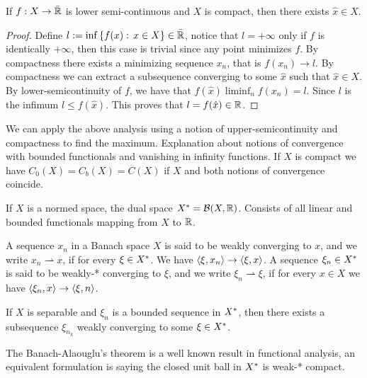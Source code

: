 \begin{theorem}
	If $f: X\rightarrow\bar{\mathbb{R}}$ is lower semi-continuous and $X$ is compact, then there exists $\hat x \in X$.
	\begin{proof}
		Define $l:=\inf\left\lbrace f(x): \, x \in X \right\rbrace \in \bar{\mathbb{R}}$, notice that $l=+\infty$ only if $f$ is identically $+\infty$, then this case is trivial since any point minimizes $f$. By compactness there exists a minimizing sequence $x_n$, that is $f(x_n)\rightarrow l$. By compactness we can extract a subsequence converging to some $\hat x$ such that $\hat x \in X$. By lower-semicontinuity of $f$, we have that $f(\hat x)\liminf_n f(x_n)=l$. Since $l$ is the infimum $l\leq f(\hat x)$. This proves that $l=f(\hat{x}) \in \mathbb{R}$.
	\end{proof}
\end{theorem}

We can apply the above analysis using a notion of upper-semicontinuity and compactness to find the maximum. Explanation about notions of convergence with bounded functionals and vanishing in infinity functions. If $X$ is compact we have $C_0(X)=C_b(X)=C(X)$ if $X$ and both notions of convergence coincide.

\begin{definition}
	If $X$ is a normed space, the dual space ${X}^*=\mathcal B(X, \mathbb{R})$. Consists of all linear and bounded functionals mapping from $X$ to $\mathbb{R}$.
\end{definition}

\begin{definition}
	A sequence $x_n$ in a Banach space $X$ is said to be weakly converging to $x$, and we write $x_n \rightharpoonup x$, if for every $\xi \in {X}^*$. We have $\left\langle \xi, x_n \right\rangle\rightarrow \left\langle \xi, x \right\rangle$. A sequence $\xi_n \in {X}^*$ is said to be weakly-* converging to $\xi$, and we write $\xi_n \rightharpoonup \xi$, if for every $x\in X$ we have $\left\langle \xi_n, x \right\rangle \rightarrow \left\langle \xi, n \right\rangle$.
\end{definition}

\begin{theorem}
	If $X$ is separable and $\xi_n$ is a bounded sequence in ${X}^*$, then there exists a subsequence $\xi_{n_k}$ weakly converging to some $\xi \in {X}^*$.
\end{theorem}

The Banach-Alaouglu's theorem is a well known result in functional analysis, an equivalent formulation is saying the closed unit ball in ${X}^*$ is weak-* compact.

